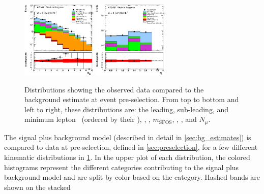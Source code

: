 \begin{figure}[ht!]
\includegraphics[width=0.32\textwidth]{figures/appendix_signal_selection/Nov24Update_FakeSys_KFacSys_LogY_NoRebin/output/jobs/MxM/DataFull_Rates_May13_FakeRatesExactly2Loose_MuonMxMBJetGt0_ElBJetGt0SubtractPC_MxM/PreselectionNov23_15_physics/weight_all/eps/NJets_histratio.eps}
\includegraphics[width=0.32\textwidth]{figures/appendix_signal_selection/Nov24Update_FakeSys_KFacSys_LogY_NoRebin/output/jobs/MxM/DataFull_Rates_May13_FakeRatesExactly2Loose_MuonMxMBJetGt0_ElBJetGt0SubtractPC_MxM/PreselectionNov23_15_physics/weight_all/eps/NMuons_histratio.eps}
\caption{Distributions showing the observed data compared to the background estimate at event pre-selection.
From top to bottom and left to right, these distributions are: the leading, 
sub-leading, and minimum lepton \pt~(ordered by their \pt), 
\MET, \deltaphi, $m_{\textrm{SFOS}}$, \njet, \nbjet, and $N_{\mu}$.
}
\label{fig:preselection}
\end{figure}
The signal plus background model 
(described in detail in \sec\ref{sec:bg_estimates})
is compared to data at pre-selection, defined in \sec\ref{sec:preselection},
for a few different kinematic distributions 
in \fig\ref{fig:preselection}. In the upper plot of each distribution,
the colored histograms 
represent the different categories contributing to the signal 
plus background model and 
are split by color based on the category. 
Hashed bands are shown on the stacked
